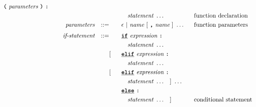 \begin{alignat*}{9}
                                   \textbf{\texttt{(}}\  \textit{parameters} \ \textbf{\texttt{)}} \
                                   \textbf{\texttt{:}} \ \quad
                                                           && \\         
&&                       &&     &\quad && \quad \textit{statement} \ \ldots \quad
                                                           && \textrm{function declaration}\\                                                           
&& \textit{parameters}   && ::= &\quad &&  \epsilon\ | \  \textit{name} \ 
                                                   [\ \textbf{\texttt{,}} \ \textit{name}\ ]\ \ldots
                                                            && \textrm{function parameters}   \\[1mm]
&& \textit{if-statement} && ::= &\quad &&  \textbf{\texttt{\underline{if}}}\ \textit{expression} \ 
                                           \textbf{\texttt{:}}  \\
&&                       &&     &\quad && \quad \textit{statement} \ \ldots \quad
                                                           &&  \\  
&&                       &&     &      [&& \textbf{\texttt{\underline{elif}}} \ \textit{expression} \
                                          \textbf{\texttt{:}} \\ 
&&                       &&     &\quad && \quad \textit{statement} \ \ldots \quad
                                                           &&  \\
&&                       &&     &      [&& \textbf{\texttt{\underline{elif}}} \ \textit{expression} \
                                          \textbf{\texttt{:}} \\ 
&&                       &&     &\quad && \quad \textit{statement} \ \ldots \quad ] \ \ldots \quad 
                                                           &&  \\     
&&                       &&     &      && \textbf{\texttt{\underline{else}}}\
                                          \textbf{\texttt{:}} \\
&&                       &&     &\quad && \quad \textit{statement} \ \ldots \quad ]
                                                           && \textrm{conditional statement}  \\[1mm]

\end{alignat*}
